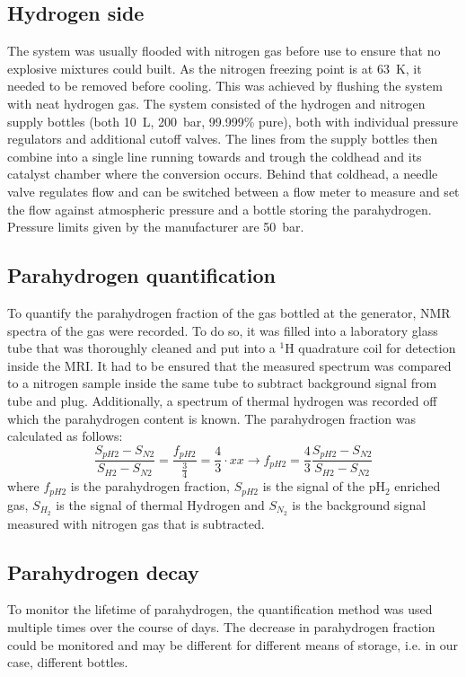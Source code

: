         \subsection{Hydrogen side}
            The system was usually flooded with nitrogen gas before use to ensure that no explosive mixtures could built. As the nitrogen freezing point is at \SI{63}{\kelvin}, it needed to be removed before cooling. This was achieved by flushing the system with neat hydrogen gas. The system consisted of the hydrogen and nitrogen supply bottles (both \SI{10}{\liter}, \SI{200}{\bar}, 99.999\% pure), both with individual pressure regulators and additional cutoff valves. The lines from the supply bottles then combine into a single line running towards and trough the coldhead and its catalyst chamber where the conversion occurs. Behind that coldhead, a needle valve regulates flow and can be switched between a flow meter to measure and set the flow against atmospheric pressure and a bottle storing the parahydrogen. Pressure limits given by the manufacturer are \SI{50}{\bar}. 
        \subsection{Parahydrogen quantification}
            To quantify the parahydrogen fraction of the gas bottled at the generator, NMR spectra of the gas were recorded. To do so, it was filled into a laboratory glass tube that was thoroughly cleaned and put into a $^{1}$H quadrature coil for detection inside the MRI. It had to be ensured that the measured spectrum was compared to a nitrogen sample inside the same tube to subtract background signal from tube and plug. Additionally, a spectrum of thermal hydrogen was recorded off which the parahydrogen content is known. The parahydrogen fraction was calculated as follows:
            \begin{equation}
                \frac{S_{pH2}-S_{N2}}{S_{H2}-S_{N2}} = \frac{f_{pH2}}{\tfrac{3}{4}} = \frac{4}{3} \cdot xx \rightarrow f_{pH2} = \frac{4}{3} \frac{S_{pH2}-S_{N2}}{S_{H2}-S_{N2}}
            \end{equation}
            where $f_{pH2}$ is the parahydrogen fraction, $S_{pH2}$ is the signal of the pH$_2$ enriched gas, $S_{H_2}$ is the signal of thermal Hydrogen and $S_{N_2}$ is the background signal measured with nitrogen gas that is subtracted.
        \subsection{Parahydrogen decay}
            To monitor the lifetime of parahydrogen, the quantification method was used multiple times over the course of days. The decrease in parahydrogen fraction could be monitored and may be different for different means of storage, i.e. in our case, different bottles.
